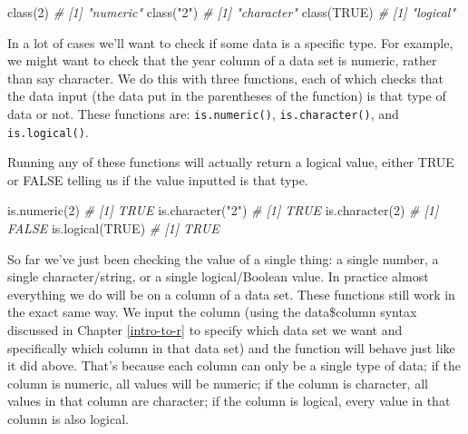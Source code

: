 \documentclass[
  a4paper,
]{krantz}
\makeatletter
\newenvironment{Shaded}{\begin{snugshade}}{\end{snugshade}}
\newcommand{\CommentTok}[1]{\textcolor[rgb]{0.37,0.37,0.37}{\textit{#1}}}
\newcommand{\ConstantTok}[1]{\textcolor[rgb]{0,0,0}{#1}}
\newcommand{\DecValTok}[1]{\textcolor[rgb]{0.06,0.06,0.06}{#1}}
\newcommand{\FunctionTok}[1]{\textcolor[rgb]{0,0,0}{#1}}
\newcommand{\NormalTok}[1]{#1}
\newcommand{\StringTok}[1]{\textcolor[rgb]{0.5,0.5,0.5}{#1}}
\newenvironment{kframe}{%
\medskip{}
\setlength{\fboxsep}{.8em}
 \def\at@end@of@kframe{}%
 \ifinner\ifhmode%
  \def\at@end@of@kframe{\end{minipage}}%
  \begin{minipage}{\columnwidth}%
 \fi\fi%
 \def\FrameCommand##1{\hskip\@totalleftmargin \hskip-\fboxsep
 \colorbox{shadecolor}{##1}\hskip-\fboxsep
     \hskip-\linewidth \hskip-\@totalleftmargin \hskip\columnwidth}%
 \MakeFramed {\advance\hsize-\width
   \@totalleftmargin\z@ \linewidth\hsize
   \@setminipage}}%
 {\par\unskip\endMakeFramed%
 \at@end@of@kframe}
\renewenvironment{Shaded}{\begin{kframe}}{\end{kframe}}
\makeatother
\begin{document}
\begin{Shaded}
\begin{Highlighting}[]
\FunctionTok{class}\NormalTok{(}\DecValTok{2}\NormalTok{)}
\CommentTok{\# [1] "numeric"}
\FunctionTok{class}\NormalTok{(}\StringTok{"2"}\NormalTok{)}
\CommentTok{\# [1] "character"}
\FunctionTok{class}\NormalTok{(}\ConstantTok{TRUE}\NormalTok{)}
\CommentTok{\# [1] "logical"}
\end{Highlighting}
\end{Shaded}

In a lot of cases we'll want to check if some data is a
specific type. For example, we might want to check that the
year column of a data set is numeric, rather than say
character. We do this with three functions, each of which
checks that the data input (the data put in the parentheses
of the function) is that type of data or not. These
functions are: \texttt{is.numeric()},
\texttt{is.character()}, and \texttt{is.logical()}.

Running any of these functions will actually return a
logical value, either TRUE or FALSE telling us if the value
inputted is that type.

\begin{Shaded}
\begin{Highlighting}[]
\FunctionTok{is.numeric}\NormalTok{(}\DecValTok{2}\NormalTok{)}
\CommentTok{\# [1] TRUE}
\FunctionTok{is.character}\NormalTok{(}\StringTok{"2"}\NormalTok{)}
\CommentTok{\# [1] TRUE}
\FunctionTok{is.character}\NormalTok{(}\DecValTok{2}\NormalTok{)}
\CommentTok{\# [1] FALSE}
\FunctionTok{is.logical}\NormalTok{(}\ConstantTok{TRUE}\NormalTok{)}
\CommentTok{\# [1] TRUE}
\end{Highlighting}
\end{Shaded}

So far we've just been checking the value of a single thing:
a single number, a single character/string, or a single
logical/Boolean value. In practice almost everything we do
will be on a column of a data set. These functions still
work in the exact same way. We input the column (using the
data\$column syntax discussed in Chapter \ref{intro-to-r} to
specify which data set we want and specifically which column
in that data set) and the function will behave just like it
did above. That's because each column can only be a single
type of data; if the column is numeric, all values will be
numeric; if the column is character, all values in that
column are character; if the column is logical, every value
in that column is also logical.
\end{document}
